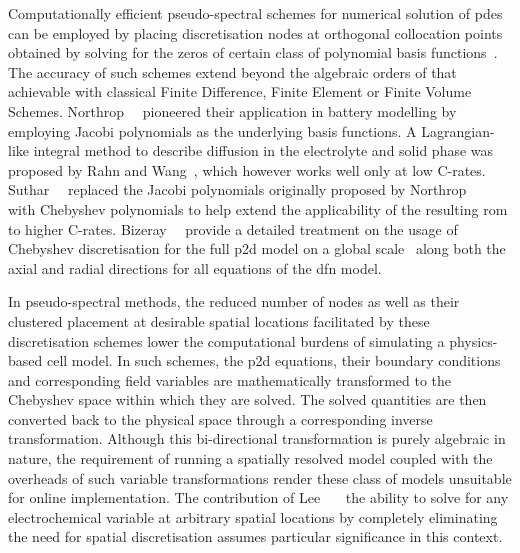 Computationally    efficient     pseudo-spectral    schemes     for    numerical
solution   of   \glspl{pde}   can   be  employed   by   placing   discretisation
nodes    at    orthogonal    collocation     points    obtained    by    solving
for     the     zeros    of     certain     class     of    polynomial     basis
functions~\cite{Ferguson1971,Trefethen2000,Boyd2001,Shizgal2015,Dutykh2016}. The
accuracy of such  schemes extend beyond the algebraic orders  of that achievable
with  classical Finite  Difference,  Finite Element  or  Finite Volume  Schemes.
Northrop~\etal{}~\cite{Northrop2011}  pioneered  their  application  in  battery
modelling  by  employing  Jacobi  polynomials  as  the underlying  basis
functions.  A  Lagrangian-like integral  method to  describe  diffusion in the
electrolyte  and  solid phase  was  proposed by  Rahn and Wang~\cite{Rahn2013},
which however works well only at low C-rates. Suthar~\etal{}~\cite{Suthar2014}
replaced  the Jacobi  polynomials  originally proposed by
Northrop~\etal~\cite{Northrop2011} with  Chebyshev polynomials to  help extend
the  applicability of the  resulting \gls{rom}  to higher C-rates.
Bizeray~\etal{}~\cite{Bizeray2015} provide a  detailed treatment on the usage of
Chebyshev  discretisation for  the full  \gls{p2d} model  on a  global scale
\ie~along both the axial and radial directions for all equations of the
\gls{dfn}  model.

In  pseudo-spectral  methods, the  reduced  number   of  nodes  as  well  as
their   clustered  placement  at desirable  spatial  locations  facilitated by
these  discretisation  schemes lower  the computational  burdens  of simulating
a  physics-based cell  model. In such schemes, the  \gls{p2d} equations,  their
boundary conditions  and corresponding  field variables  are mathematically
transformed to the Chebyshev space within which they are solved. The solved
quantities are then converted back to the physical  space through  a
corresponding  inverse transformation. Although this bi-directional
transformation is  purely algebraic  in nature, the requirement of  running a
spatially  resolved  model coupled  with  the overheads of  such variable
transformations render  these class  of models unsuitable for  online
implementation.  The contribution  of Lee~\etal~\cite{Lee2012a,Lee2012}  \ie~the
ability to solve for any electrochemical variable at arbitrary spatial locations
by completely eliminating the need for spatial discretisation assumes particular
significance in this context.




